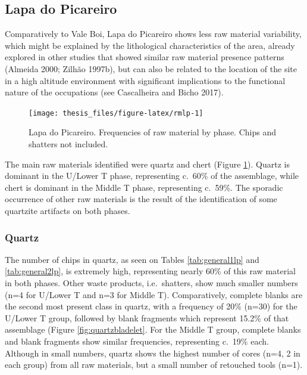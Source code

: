 \documentclass[12pt,twoside]{reedthesis}
\begin{document}
\hypertarget{lapa-do-picareiro-3}{%
\subsection{Lapa do Picareiro}\label{lapa-do-picareiro-3}}

Comparatively to Vale Boi, Lapa do Picareiro shows less raw material variability, which might be explained by the lithological characteristics of the area, already explored in other studies that showed similar raw material presence patterns (Almeida 2000; Zilhão 1997b), but can also be related to the location of the site in a high altitude environment with significant implications to the functional nature of the occupations (see Cascalheira and Bicho 2017).
\begin{figure}[H]

{\centering \texttt{[image: thesis\_files/figure-latex/rmlp-1]} 

}

\caption{Lapa do Picareiro. Frequencies of raw material by phase. Chips and shatters not included.}\label{fig:rmlp}
\end{figure}
The main raw materials identified were quartz and chert (Figure \ref{fig:rmlp}). Quartz is dominant in the U/Lower T phase, representing c.~60\% of the assemblage, while chert is dominant in the Middle T phase, representing c.~59\%. The sporadic occurrence of other raw materials is the result of the identification of some quartzite artifacts on both phases.

\hypertarget{quartz-1}{%
\subsubsection{Quartz}\label{quartz-1}}

The number of chips in quartz, as seen on Tables \ref{tab:general1lp} and \ref{tab:general2lp}, is extremely high, representing nearly 60\% of this raw material in both phases. Other waste products, i.e.~shatters, show much smaller numbers (n=4 for U/Lower T and n=3 for Middle T). Comparatively, complete blanks are the second most present class in quartz, with a frequency of 20\% (n=30) for the U/Lower T group, followed by blank fragments which represent 15.2\% of that assemblage (Figure \ref{fig:quartzbladelet}. For the Middle T group, complete blanks and blank fragments show similar frequencies, representing c.~19\% each. Although in small numbers, quartz shows the highest number of cores (n=4, 2 in each group) from all raw materials, but a small number of retouched tools (n=1).
\end{document}
